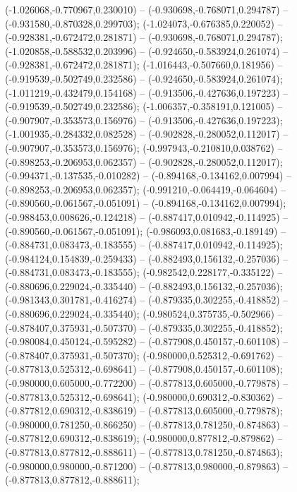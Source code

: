  (-1.026068,-0.770967,0.230010) -- (-0.930698,-0.768071,0.294787) -- (-0.931580,-0.870328,0.299703);
 (-1.024073,-0.676385,0.220052) -- (-0.928381,-0.672472,0.281871) -- (-0.930698,-0.768071,0.294787);
 (-1.020858,-0.588532,0.203996) -- (-0.924650,-0.583924,0.261074) -- (-0.928381,-0.672472,0.281871);
 (-1.016443,-0.507660,0.181956) -- (-0.919539,-0.502749,0.232586) -- (-0.924650,-0.583924,0.261074);
 (-1.011219,-0.432479,0.154168) -- (-0.913506,-0.427636,0.197223) -- (-0.919539,-0.502749,0.232586);
 (-1.006357,-0.358191,0.121005) -- (-0.907907,-0.353573,0.156976) -- (-0.913506,-0.427636,0.197223);
 (-1.001935,-0.284332,0.082528) -- (-0.902828,-0.280052,0.112017) -- (-0.907907,-0.353573,0.156976);
 (-0.997943,-0.210810,0.038762) -- (-0.898253,-0.206953,0.062357) -- (-0.902828,-0.280052,0.112017);
 (-0.994371,-0.137535,-0.010282) -- (-0.894168,-0.134162,0.007994) -- (-0.898253,-0.206953,0.062357);
 (-0.991210,-0.064419,-0.064604) -- (-0.890560,-0.061567,-0.051091) -- (-0.894168,-0.134162,0.007994);
 (-0.988453,0.008626,-0.124218) -- (-0.887417,0.010942,-0.114925) -- (-0.890560,-0.061567,-0.051091);
 (-0.986093,0.081683,-0.189149) -- (-0.884731,0.083473,-0.183555) -- (-0.887417,0.010942,-0.114925);
 (-0.984124,0.154839,-0.259433) -- (-0.882493,0.156132,-0.257036) -- (-0.884731,0.083473,-0.183555);
 (-0.982542,0.228177,-0.335122) -- (-0.880696,0.229024,-0.335440) -- (-0.882493,0.156132,-0.257036);
 (-0.981343,0.301781,-0.416274) -- (-0.879335,0.302255,-0.418852) -- (-0.880696,0.229024,-0.335440);
 (-0.980524,0.375735,-0.502966) -- (-0.878407,0.375931,-0.507370) -- (-0.879335,0.302255,-0.418852);
 (-0.980084,0.450124,-0.595282) -- (-0.877908,0.450157,-0.601108) -- (-0.878407,0.375931,-0.507370);
 (-0.980000,0.525312,-0.691762) -- (-0.877813,0.525312,-0.698641) -- (-0.877908,0.450157,-0.601108);
 (-0.980000,0.605000,-0.772200) -- (-0.877813,0.605000,-0.779878) -- (-0.877813,0.525312,-0.698641);
 (-0.980000,0.690312,-0.830362) -- (-0.877812,0.690312,-0.838619) -- (-0.877813,0.605000,-0.779878);
 (-0.980000,0.781250,-0.866250) -- (-0.877813,0.781250,-0.874863) -- (-0.877812,0.690312,-0.838619);
 (-0.980000,0.877812,-0.879862) -- (-0.877813,0.877812,-0.888611) -- (-0.877813,0.781250,-0.874863);
 (-0.980000,0.980000,-0.871200) -- (-0.877813,0.980000,-0.879863) -- (-0.877813,0.877812,-0.888611);
